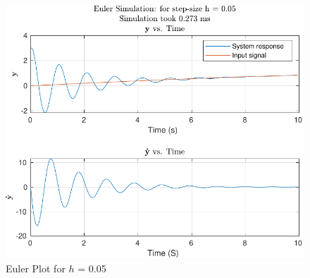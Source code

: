 \documentclass[12pt]{article}
\begin{document}
		\begin{figure}[H]
			\centering
			\includegraphics[width=1\linewidth]{"Code/Fig/Euler_plot_h_0.05.pdf"}
			\caption{Euler Plot for $h$ = 0.05}
			\label{fig:eulerploth005}
		\end{figure}
		
\end{document}

